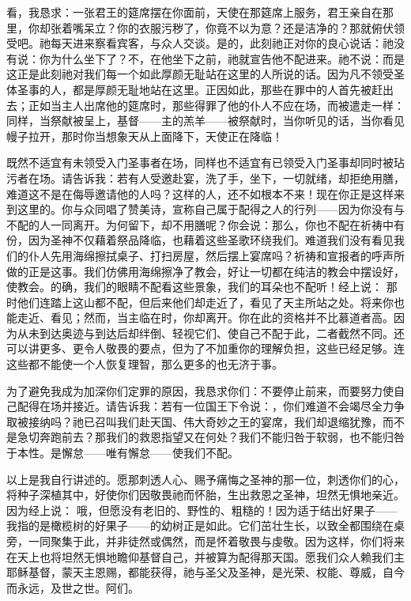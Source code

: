 看，我恳求：一张君王的筵席摆在你面前，天使在那筵席上服务，君王亲自在那里，你却张着嘴呆立？你的衣服污秽了，你竟不以为意？还是洁净的？那就俯伏领受吧。祂每天进来察看宾客，与众人交谈。是的，此刻祂正对你的良心说话：祂没有说：你为什么坐下了？不，在他坐下之前，祂就宣告他不配进来。祂不说：而是这正是此刻祂对我们每一个如此厚颜无耻站在这里的人所说的话。因为凡不领受圣体圣事的人，都是厚颜无耻地站在这里。正因如此，那些在罪中的人首先被赶出去；正如当主人出席他的筵席时，那些得罪了他的仆人不应在场，而被遣走一样：同样，当祭献被呈上，基督——主的羔羊——被祭献时，当你听见的话，当你看见幔子拉开，那时你当想象天从上面降下，天使正在降临！\par

既然不适宜有未领受入门圣事者在场，同样也不适宜有已领受入门圣事却同时被玷污者在场。请告诉我：若有人受邀赴宴，洗了手，坐下，一切就绪，却拒绝用膳，难道这不是在侮辱邀请他的人吗？这样的人，还不如根本不来！现在你正是这样来到这里的。你与众同唱了赞美诗，宣称自己属于配得之人的行列——因为你没有与不配的人一同离开。为何留下，却不用膳呢？你会说：那么，你也不配在祈祷中有份，因为圣神不仅藉着祭品降临，也藉着这些圣歌环绕我们。难道我们没有看见我们的仆人先用海绵擦拭桌子、打扫房屋，然后摆上宴席吗？祈祷和宣报者的呼声所做的正是这事。我们仿佛用海绵擦净了教会，好让一切都在纯洁的教会中摆设好，使教会。的确，我们的眼睛不配看这些景象，我们的耳朵也不配听！经上说： 那时他们连踏上这山都不配，但后来他们却走近了，看见了天主所站之处。将来你也能走近、看见；然而，当主临在时，你却离开。你在此的资格并不比慕道者高。因为从未到达奥迹与到达后却绊倒、轻视它们、使自己不配于此，二者截然不同。还可以讲更多、更令人敬畏的要点，但为了不加重你的理解负担，这些已经足够。连这些都不能使一个人恢复理智，那么更多的也无济于事。\par

为了避免我成为加深你们定罪的原因，我恳求你们：不要停止前来，而要努力使自己配得在场并接近。请告诉我：若有一位国王下令说：，你们难道不会竭尽全力争取被接纳吗？祂已召叫我们赴天国、伟大奇妙之王的宴席，我们却退缩犹豫，而不是急切奔跑前去？那我们的救恩指望又在何处？我们不能归咎于软弱，也不能归咎于本性。是懈怠——唯有懈怠——使我们不配。\par

以上是我自行讲述的。愿那刺透人心、赐予痛悔之圣神的那一位，刺透你们的心，将种子深植其中，好使你们因敬畏祂而怀胎，生出救恩之圣神，坦然无惧地亲近。因为经上说： 哦，但愿没有老旧的、野性的、粗糙的！因为适于结出好果子——我指的是橄榄树的好果子——的幼树正是如此。它们茁壮生长，以致全都围绕在桌旁，一同聚集于此，并非徒然或偶然，而是怀着敬畏与虔敬。因为这样，你们将来在天上也将坦然无惧地瞻仰基督自己，并被算为配得那天国。愿我们众人赖我们主耶稣基督，蒙天主恩赐，都能获得，祂与圣父及圣神，是光荣、权能、尊威，自今而永远，及世之世。阿们。\par

